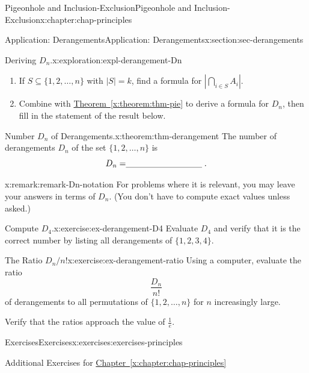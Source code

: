 \documentclass[oneside,10pt,]{book}
\newcommand{\xreffont}{\relax}
\newcommand{\fillin}[1]{\leavevmode\leaders\vrule height -1.2pt depth 1.5pt \hskip #1em minus #1em \null}
\numberwithin{equation}{section}
\begin{document}
\begin{chapterptx}{Pigeonhole and Inclusion-Exclusion}{}{Pigeonhole and Inclusion-Exclusion}{}{}{x:chapter:chap-principles}
\begin{sectionptx}{Application: Derangements}{}{Application: Derangements}{}{}{x:section:sec-derangements}
\begin{exploration}{Deriving \(D_n\).}{x:exploration:expl-derangement-Dn}
\begin{enumerate}[font=\bfseries,label=(\alph*),ref=\alph*]
\par
Then, express \(D_n\) as the cardinality of a set involving the \(A_i\)'s.%
\item{}If \(S \subseteq \{1,2,\ldots,n\}\) with \(|S| = k\), find a formula for \(\left|\displaystyle\bigcap_{i \in S} A_i\right|\).%
\item{}Combine with \hyperref[x:theorem:thm-pie]{Theorem~{\xreffont\ref{x:theorem:thm-pie}}} to derive a formula for \(D_n\), then fill in the statement of the result below.%
\end{enumerate}
\end{exploration}
\begin{theorem}{Number \(D_n\) of Derangements.}{}{x:theorem:thm-derangement}%
The number of derangements \(D_n\) of the set \(\{1,2,\ldots,n\}\) is%
\begin{equation*}
D_n = \fillin{9.090909090909092}\text{.}
\end{equation*}
%
\end{theorem}
\begin{remark}{}{x:remark:remark-Dn-notation}%
For problems where it is relevant, you may leave your answers in terms of \(D_n\). (You don't have to compute exact values unless asked.)%
\end{remark}
\begin{inlineexercise}{Compute \(D_4\).}{x:exercise:ex-derangement-D4}%
Evaluate \(D_4\) and verify that it is the correct number by listing all derangements of \(\{1,2,3,4\}\).%
\end{inlineexercise}
\begin{inlineexercise}{The Ratio \(D_n/n!\)}{x:exercise:ex-derangement-ratio}%
Using a computer, evaluate the ratio%
\begin{equation*}
\frac{D_n}{n!}
\end{equation*}
of derangements to all permutations of \(\{1,2,\ldots,n\}\) for \(n\) increasingly large.%
\par
Verify that the ratios approach the value of \(\frac{1}{e}\).%
\end{inlineexercise}
\end{sectionptx}
%
%
\typeout{************************************************}
\typeout{************************************************}
%
\begin{exercises-section}{Exercises}{}{Exercises}{}{}{x:exercises:exercises-principles}
\begin{introduction}{}%
Additional Exercises for \hyperref[x:chapter:chap-principles]{Chapter~{\xreffont\ref{x:chapter:chap-principles}}}%

\end{introduction}
\end{exercises-section}
\end{chapterptx}
\end{document}
